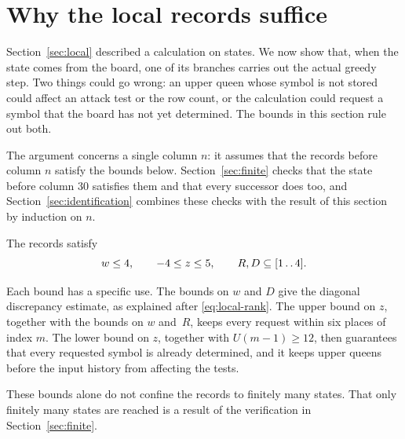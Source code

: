 \section{Why the local records suffice}\label{sec:sufficiency}

Section~\ref{sec:local} described a calculation on states. We now
show that, when the state comes from the board, one of its branches
carries out the actual greedy step. Two things could go wrong: an
upper queen whose symbol is not stored could affect an attack test or
the row count, or the calculation could request a symbol that the
board has not yet determined. The bounds in this section rule out
both.

The argument concerns a single column $n$: it assumes that the records
before column $n$ satisfy the bounds below. Section~\ref{sec:finite}
checks that the state before column $30$ satisfies them and that every
successor does too, and Section~\ref{sec:identification} combines these
checks with the result of this section by induction on $n$.

\begin{condition}\label{cond:state}
The records satisfy
\begin{equation}\label{eq:state-bounds}
 w\le4,\qquad -4\le z\le5,\qquad R,D\subseteq[1\mathinner{\ldotp\ldotp}4].
\end{equation}
\end{condition}

Each bound has a specific use. The bounds on $w$ and $D$ give the
diagonal discrepancy estimate, as explained after
\eqref{eq:local-rank}. The upper bound on $z$, together with the
bounds on $w$ and~$R$, keeps every request within six places of
index $m$. The lower bound on $z$, together with $U(m-1)\ge12$, then
guarantees that every requested symbol is already determined, and it
keeps upper queens before the input history from affecting the
tests.

These bounds alone do not confine the records to finitely many
states. That only finitely many states are reached is a result of
the verification in Section~\ref{sec:finite}.

